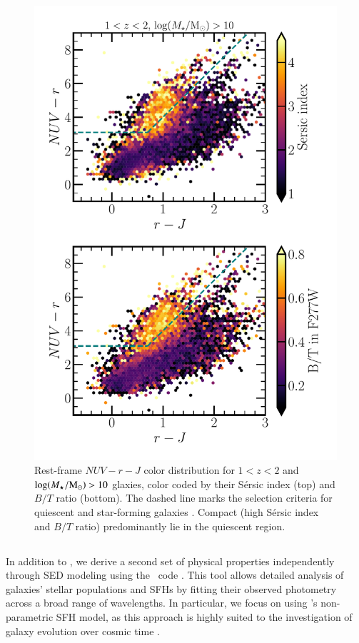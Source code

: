 \documentclass[longauth]{aa}
\begin{document}
\begin{figure}[t!]
\centering
\includegraphics[width=0.9\columnwidth]{figures/Morpho-demonstration.pdf}
\caption{Rest-frame $NUV-r-J$ color distribution for $1<z<2$ and $\log(M_{\star}/{\rm M}_{\odot})>10$ glaxies, color coded by their Sérsic index (top) and $B/T$ ratio (bottom). The dashed line marks the selection criteria for quiescent and star-forming galaxies \citep{ilbert_mass_2013}. Compact (high Sérsic index and $B/T$ ratio) predominantly lie in the quiescent region.}
\label{fig:morpho-color}
\end{figure}



\subsection{\cigale } \label{sec:physical-prop-cigale }

In addition to \lephare{}, we derive a second set of physical properties independently through SED modeling using the \cigale\ code \citep{Boquien19}. This tool allows detailed analysis of galaxies' stellar populations and SFHs by fitting their observed photometry across a broad range of wavelengths. In particular, we focus on using \cigale's non-parametric SFH model, as this approach is highly suited to the investigation of galaxy evolution over cosmic time \citep{Arango-Toro2023,Arango-Toro2024, Ciesla2024b,Duan2024,Wuan2024}.
\end{document}
